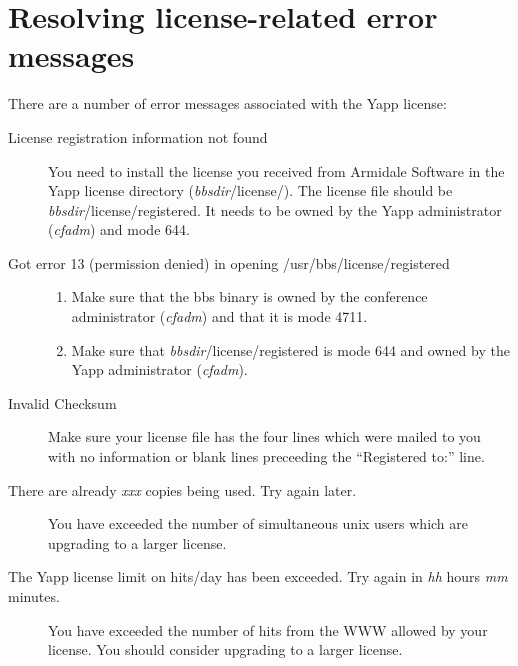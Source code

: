 \documentclass[twoside]{report}
\begin{document}
   \section{Resolving license-related error messages}
      There are a number of error messages associated with the Yapp 
      license:
      \begin{description}
         \item[License registration information not found]
            \mbox{}\newline
            You need to install the license you received from Armidale Software
            in the Yapp license directory ({\em bbsdir}/license/).  The license 
            file should be {\em bbsdir}/license/registered.  
            It needs to be 
            owned by the Yapp administrator ({\em cfadm}) and mode 644.

         \item[Got error 13 (permission denied) in opening /usr/bbs/license/registered]
            \mbox{}\newline\vspace{-12pt}
            \begin{enumerate}
            \item Make sure that the bbs binary is owned by the conference 
               administrator ({\em cfadm}) and that it is mode 4711.

            \item Make sure that {\em bbsdir}/license/registered is mode 644 
               and owned by the Yapp administrator ({\em cfadm}).
            \end{enumerate}

         \item[Invalid Checksum]
            \mbox{}\newline
            Make sure your license file has the four lines which were mailed 
            to you with no information or blank lines preceeding the 
            ``Registered to:'' line.

         \item[There are already {\em xxx} copies being used. Try again later.]
            \mbox{}\newline
            You have exceeded the number of simultaneous unix users which are 
            upgrading to a larger license.

         \item[The Yapp license limit on hits/day has been exceeded. Try again
               in {\em hh} hours {\em mm} minutes.]
            \mbox{}\newline
            You have exceeded the number of hits from the WWW allowed by your 
            license. You should consider upgrading to a larger license.
      \end{description}
\end{document}
